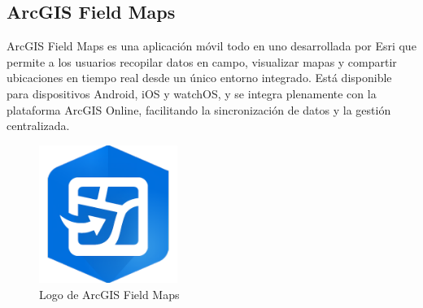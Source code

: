 \documentclass[12pt, a4paper]{book}
\begin{document}
\subsection{ArcGIS Field Maps}

ArcGIS Field Maps \cite{esriFieldMaps} es una aplicación móvil todo en uno desarrollada por Esri que permite a los usuarios recopilar datos en campo, visualizar mapas y compartir ubicaciones en tiempo real desde un único entorno integrado. Está disponible para dispositivos Android, iOS y watchOS, y se integra plenamente con la plataforma ArcGIS Online, facilitando la sincronización de datos y la gestión centralizada.

\begin{figure}[h]
  \centering
  \includegraphics[width=0.4\textwidth]{images/arcgis_logo.png}
  \caption{Logo de ArcGIS Field Maps}
  \label{fig:arcgisfieldmapslogo}
\end{figure}
\end{document}
